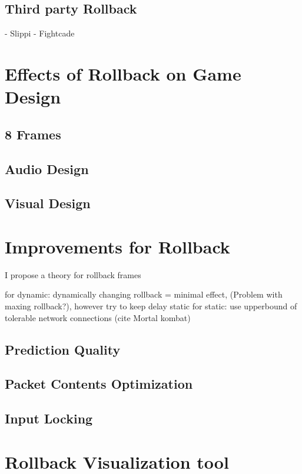 \documentclass{entcs}
\begin{document}
\subsection{Third party Rollback}
- Slippi
- Fightcade

\section{Effects of Rollback on Game Design}
\subsection{8 Frames}
\subsection{Audio Design}
\subsection{Visual Design}


\section{Improvements for Rollback}

I propose a theory for rollback frames 


for dynamic: dynamically changing rollback = minimal effect, (Problem with maxing rollback?), however try to keep delay static
for static: use upperbound of tolerable network connections (cite Mortal kombat)

\subsection{Prediction Quality}
\subsection{Packet Contents Optimization}
\subsection{Input Locking}

\section{Rollback Visualization tool}
\end{document}
